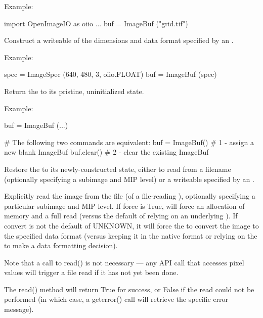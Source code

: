 \noindent Example:
\begin{code}
    import OpenImageIO as oiio
    ...
    buf = ImageBuf ("grid.tif")
\end{code}
\apiend


Construct a writeable \ImageBuf of the dimensions and data format specified
by an \ImageSpec.

\noindent Example:
\begin{code}
    spec = ImageSpec (640, 480, 3, oiio.FLOAT)
    buf = ImageBuf (spec)
\end{code}
\apiend

Return the \ImageBuf to its pristine, uninitialized state.

\noindent Example:
\begin{code}
    buf = ImageBuf (...)

    # The following two commands are equivalent:
    buf = ImageBuf()     # 1 - assign a new blank ImageBuf
    buf.clear()               # 2 - clear the existing ImageBuf
\end{code}
\apiend

Restore the \ImageBuf to its newly-constructed state, either to read from
a filename (optionally specifying a subimage and MIP level) or a writeable
\ImageBuf specified by an \ImageSpec.
\apiend

Explicitly read the image from the file (of a file-reading \ImageBuf), optionally
specifying a particular subimage and MIP level.  If {\cf force} is {\cf True},
will force an allocation of memory and a full read (versus the default of
relying on an underlying \ImageCache).  If {\cf convert} is not
the default of {\cf UNKNOWN}, it will force the \ImageBuf to convert the
image to the specified data format (versus keeping it in the native 
format or relying on the \ImageCache to make a data formatting decision).

Note that a call to {\cf read()} is not necessary --- any \ImageBuf API call
that accesses pixel values will trigger a file read if it has not yet been
done.

The {\cf read()} method will return {\cf True} for success, or {\cf False}
if the read could not be performed (in which case, a {\cf geterror()} call
will retrieve the specific error message).

